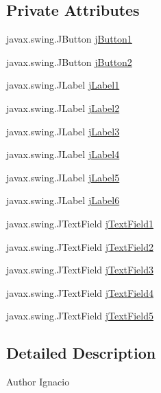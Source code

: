 \subsection*{Private Attributes}
\begin{DoxyCompactItemize}
\item 
javax.\+swing.\+J\+Button \mbox{\hyperlink{classsoftware_1_1registrar_aef5c4d6cf5be63bd07f311ce4f590faf}{j\+Button1}}
\item 
javax.\+swing.\+J\+Button \mbox{\hyperlink{classsoftware_1_1registrar_aad55bb3040eec6aa4685c2641dbff85b}{j\+Button2}}
\item 
javax.\+swing.\+J\+Label \mbox{\hyperlink{classsoftware_1_1registrar_a110efbfc5ad3341638ea3ee89aa6f204}{j\+Label1}}
\item 
javax.\+swing.\+J\+Label \mbox{\hyperlink{classsoftware_1_1registrar_a24b0c3144951c1a694a839a57632b467}{j\+Label2}}
\item 
javax.\+swing.\+J\+Label \mbox{\hyperlink{classsoftware_1_1registrar_ab18af739a7842cf44586f9f1ccf4cb5d}{j\+Label3}}
\item 
javax.\+swing.\+J\+Label \mbox{\hyperlink{classsoftware_1_1registrar_a1cc93efa5caf9078801eef6056e86867}{j\+Label4}}
\item 
javax.\+swing.\+J\+Label \mbox{\hyperlink{classsoftware_1_1registrar_a8155b7123176cb4088549ac2325f25f4}{j\+Label5}}
\item 
javax.\+swing.\+J\+Label \mbox{\hyperlink{classsoftware_1_1registrar_a613b33aab588faff234599788161a0aa}{j\+Label6}}
\item 
javax.\+swing.\+J\+Text\+Field \mbox{\hyperlink{classsoftware_1_1registrar_a530c642d7e5cc327ce37e22d77ae4172}{j\+Text\+Field1}}
\item 
javax.\+swing.\+J\+Text\+Field \mbox{\hyperlink{classsoftware_1_1registrar_a3270231d8e402db892c290279dcdb893}{j\+Text\+Field2}}
\item 
javax.\+swing.\+J\+Text\+Field \mbox{\hyperlink{classsoftware_1_1registrar_ac033f6f71314c40dbfb8d1925cc363f5}{j\+Text\+Field3}}
\item 
javax.\+swing.\+J\+Text\+Field \mbox{\hyperlink{classsoftware_1_1registrar_a439caf9553404d6b620bd02d9dd6c644}{j\+Text\+Field4}}
\item 
javax.\+swing.\+J\+Text\+Field \mbox{\hyperlink{classsoftware_1_1registrar_a02ef72d4de1e5346b47314c18049f0ba}{j\+Text\+Field5}}
\end{DoxyCompactItemize}


\subsection{Detailed Description}
\begin{DoxyAuthor}{Author}
Ignacio 
\end{DoxyAuthor}


